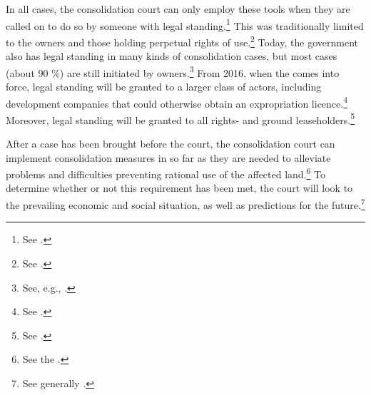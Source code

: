In all cases, the consolidation court can only employ these tools when they are called on to do so by someone with legal standing.\footnote{See \dni\cite[5]{lca79}.} This was traditionally limited to the owners and those holding perpetual rights of use.\footnote{See \dni\cite[5]{lca79}.} Today, the government also has legal standing in many kinds of consolidation cases, but most cases (about 90 \%) are still initiated by owners.\footnote{See, e.g., \cite[135]{bjerva12}.} From 2016, when the \cite{lca13} comes into force, legal standing will be granted to a larger class of actors, including development companies that could otherwise obtain an expropriation licence.\footnote{See \dni\cite[1-5(3)]{lca13}.} Moreover, legal standing will be granted to all rights- and ground leaseholders.\footnote{See \dni\cite[1-5(1)]{lca13}.}

After a case has been brought before the court, the consolidation court can implement consolidation measures in so far as they are needed to alleviate problems and difficulties preventing rational use of the affected land.\footnote{See the \dni\cite[1]{lca79}.} To determine whether or not this requirement has been met, the court will look to the prevailing economic and social situation, as well as predictions for the future.\footnote{See generally \cite{reiten09}.} %

